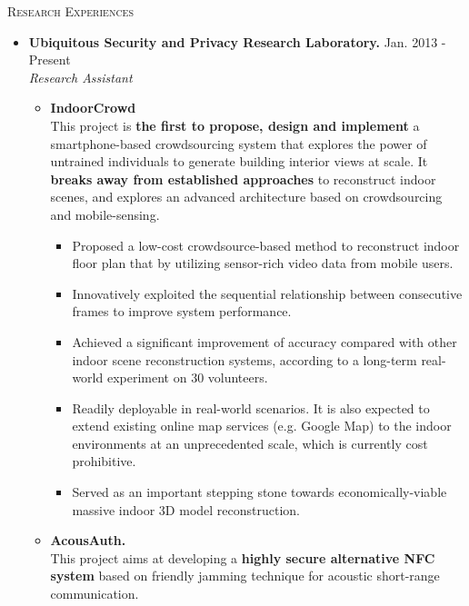 \documentclass[letter]{article}
\newcommand{\heading}[1]{\item \large \textsc{#1} \normalsize}
\newenvironment{experience}[4]{
\item \textbf{#1.} \hfill #3 - #4 \\
\emph{#2}
}{
}
\begin{document}
\begin{description}
\begin{enumerate}[{P-}1.]
\end{enumerate}

\heading{Research Experiences}

\begin{itemize}

\begin{experience}
{Ubiquitous Security and Privacy Research Laboratory}
{Research Assistant}
{Jan. 2013}{Present}
\begin{itemize}
\item \textbf{IndoorCrowd}\\
This project is \textbf{the first to propose, design and implement} a smartphone-based crowdsourcing system that explores the power of untrained individuals to generate building interior views at scale. It \textbf{breaks away from established approaches} to reconstruct indoor scenes, and explores an advanced architecture based on crowdsourcing and mobile-sensing.
\begin{itemize}

\item Proposed a low-cost crowdsource-based method to reconstruct indoor floor plan that by utilizing sensor-rich video data from mobile users.
\item Innovatively exploited the sequential relationship between consecutive
frames to improve system performance.
\item Achieved a significant improvement of accuracy compared with other indoor scene reconstruction systems, according to a long-term real-world experiment on 30 volunteers. 
\item Readily deployable in real-world scenarios. It is also expected to extend existing online map services (e.g. Google Map) to the indoor environments at an unprecedented scale, which is currently cost prohibitive. 
\item Served as an important stepping stone towards economically-viable massive indoor 3D model reconstruction. 
\end{itemize}

\item \textbf{AcousAuth.} \\
This project aims at developing a \textbf{highly secure alternative NFC system} based on friendly jamming technique for acoustic short-range communication. 
\begin{itemize}


\end{itemize}
\end{itemize}
\end{experience}
\end{itemize}
\end{description}
\end{document}
